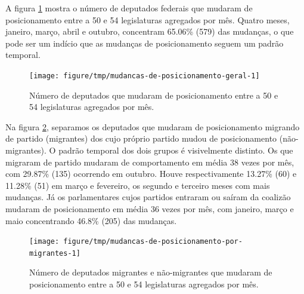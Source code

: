 \documentclass[a4paper,titlepage]{ppgi}\usepackage[]{graphicx}\usepackage[]{color}
\newenvironment{knitrout}{}{} %
\begin{document}
A figura \ref{fig:mudancas-de-posicionamento-geral} mostra o número de
deputados federais que mudaram de posicionamento entre a 50\textordfeminine{} e
54\textordfeminine{} legislaturas agregados por mês. Quatro meses, janeiro,
março, abril e outubro, concentram
65.06\%
(579) das mudanças, o que pode
ser um indício que as mudanças de posicionamento seguem um padrão temporal.

\begin{knitrout}
\color{fgcolor}\begin{figure}
\texttt{[image: figure/tmp/mudancas-de-posicionamento-geral-1]} \caption[Número de deputados que mudaram de posicionamento entre a 50\textordfeminine{} e 54\textordfeminine{} legislaturas agregados por mês]{Número de deputados que mudaram de posicionamento entre a 50\textordfeminine{} e 54\textordfeminine{} legislaturas agregados por mês.}\label{fig:mudancas-de-posicionamento-geral}
\end{figure}


\end{knitrout}

Na figura \ref{fig:mudancas-de-posicionamento-por-migrantes}, separamos os
deputados que mudaram de posicionamento migrando de partido (migrantes) dos
cujo próprio partido mudou de posicionamento (não-migrantes). O padrão temporal
dos dois grupos é visivelmente distinto. Os que migraram de partido mudaram de
comportamento em média 38 vezes por mês, com
29.87\%
(135) ocorrendo em outubro. Houve respectivamente
13.27\%
(60) e
11.28\%
(51) em março e fevereiro, os segundo e terceiro
meses com mais mudanças. Já os parlamentares cujos partidos entraram ou saíram
da coalizão mudaram de posicionamento em média
36 vezes por mês, com janeiro, março e
maio concentrando
46.8\%
(205) das mudanças.

\begin{knitrout}
\color{fgcolor}\begin{figure}
\texttt{[image: figure/tmp/mudancas-de-posicionamento-por-migrantes-1]} \caption[Número de deputados migrantes e não-migrantes que mudaram de posicionamento entre a 50\textordfeminine{} e 54\textordfeminine{} legislaturas agregados por mês]{Número de deputados migrantes e não-migrantes que mudaram de posicionamento entre a 50\textordfeminine{} e 54\textordfeminine{} legislaturas agregados por mês.}\label{fig:mudancas-de-posicionamento-por-migrantes}
\end{figure}


\end{knitrout}
\end{document}
